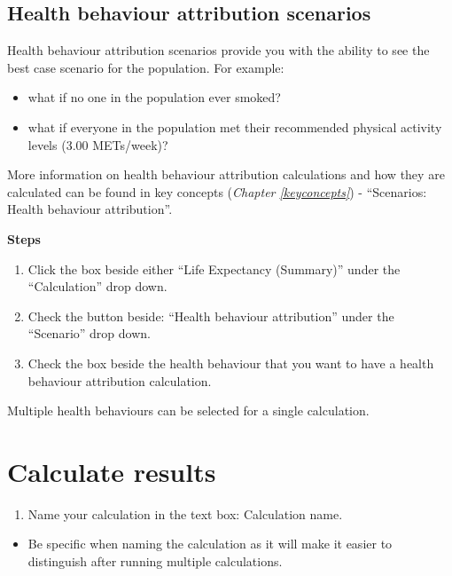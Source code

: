 \documentclass[]{book}
\providecommand{\tightlist}{%
  \setlength{\itemsep}{0pt}\setlength{\parskip}{0pt}}
\begin{document}
\subsection{Health behaviour attribution
scenarios}\label{health-behaviour-attribution-scenarios}

Health behaviour attribution scenarios provide you with the ability to
see the best case scenario for the population. For example:

\begin{itemize}
\tightlist
\item
  what if no one in the population ever smoked?
\item
  what if everyone in the population met their recommended physical
  activity levels (3.00 METs/week)?
\end{itemize}

More information on health behaviour attribution calculations and how
they are calculated can be found in key concepts (\emph{Chapter
\ref{keyconcepts}}) - ``Scenarios: Health behaviour attribution''.

\textbf{Steps}

\begin{enumerate}
\def\labelenumi{\arabic{enumi}.}
\item
  Click the box beside either ``Life Expectancy (Summary)'' under the
  ``Calculation'' drop down.
\item
  Check the button beside: ``Health behaviour attribution'' under the
  ``Scenario'' drop down.
\item
  Check the box beside the health behaviour that you want to have a
  health behaviour attribution calculation.
\end{enumerate}

Multiple health behaviours can be selected for a single calculation.

\section{Calculate results}\label{calculate-results}

\begin{enumerate}
\def\labelenumi{\arabic{enumi}.}
\tightlist
\item
  Name your calculation in the text box: Calculation name.
\end{enumerate}

\begin{itemize}
\tightlist
\item
  Be specific when naming the calculation as it will make it easier to
  distinguish after running multiple calculations.
\end{itemize}
\end{document}

